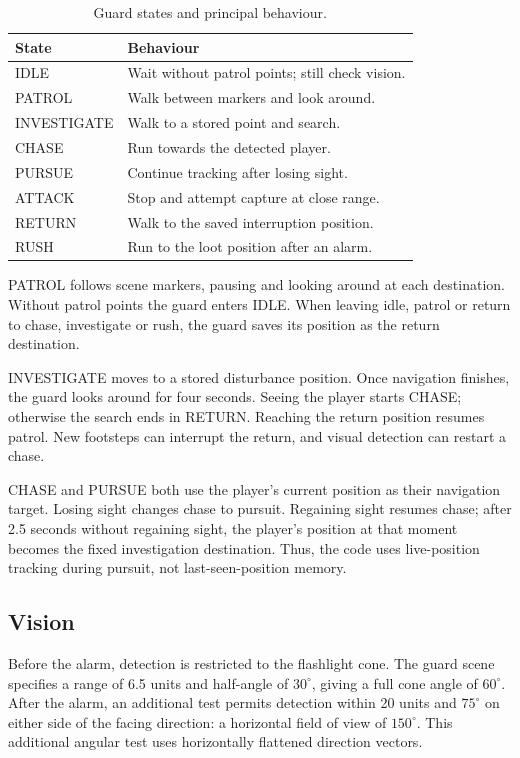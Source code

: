 \documentclass[fleqn,10pt]{SelfArx}
\newcommand{\state}[1]{\textsf{#1}}
\begin{document}
\begin{table}[tb]
\caption{Guard states and principal behaviour.}
\label{tab:states}
\small\centering
\begin{tabular}{@{}lp{}@{}}
\toprule
State & Behaviour \\
\midrule
\state{IDLE} & Wait without patrol points; still check vision. \\
\state{PATROL} & Walk between markers and look around. \\
\state{INVESTIGATE} & Walk to a stored point and search. \\
\state{CHASE} & Run towards the detected player. \\
\state{PURSUE} & Continue tracking after losing sight. \\
\state{ATTACK} & Stop and attempt capture at close range. \\
\state{RETURN} & Walk to the saved interruption position. \\
\state{RUSH} & Run to the loot position after an alarm. \\
\bottomrule
\end{tabular}
\end{table}

\state{PATROL} follows scene markers, pausing and looking around at each destination. Without patrol points the guard enters \state{IDLE}. When leaving idle, patrol or return to chase, investigate or rush, the guard saves its position as the return destination.

\state{INVESTIGATE} moves to a stored disturbance position. Once navigation finishes, the guard looks around for four seconds. Seeing the player starts \state{CHASE}; otherwise the search ends in \state{RETURN}. Reaching the return position resumes patrol. New footsteps can interrupt the return, and visual detection can restart a chase.

\state{CHASE} and \state{PURSUE} both use the player's current position as their navigation target. Losing sight changes chase to pursuit. Regaining sight resumes chase; after 2.5 seconds without regaining sight, the player's position at that moment becomes the fixed investigation destination. Thus, the code uses live-position tracking during pursuit, not last-seen-position memory.

\subsection{Vision}
Before the alarm, detection is restricted to the flashlight cone. The guard scene specifies a range of 6.5 units and half-angle of $30^{\circ}$, giving a full cone angle of $60^{\circ}$. After the alarm, an additional test permits detection within 20 units and $75^{\circ}$ on either side of the facing direction: a horizontal field of view of $150^{\circ}$. This additional angular test uses horizontally flattened direction vectors.
\end{document}
